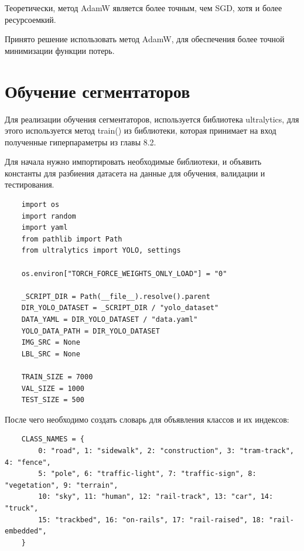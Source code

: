 \documentclass[areasetadvanced]{scrartcl}
\begin{document}
Теоретически, метод AdamW является более точным, чем SGD, хотя и более ресурсоемкий.

Принято решение использовать метод AdamW, для обеспечения более точной минимизации функции потерь.

\newpage
\section{Обучение сегментаторов}
Для реализации обучения сегментаторов, используется библиотека ultralytics, 
для этого используется метод train() из библиотеки, которая принимает на вход полученные 
гиперпараметры из главы 8.2.

Для начала нужно импортировать необходимые библиотеки, и объявить константы для разбиения датасета на
данные для обучения, валидации и тестирования.

\begin{lstlisting}
    import os
    import random
    import yaml
    from pathlib import Path
    from ultralytics import YOLO, settings
    
    os.environ["TORCH_FORCE_WEIGHTS_ONLY_LOAD"] = "0"
    
    _SCRIPT_DIR = Path(__file__).resolve().parent
    DIR_YOLO_DATASET = _SCRIPT_DIR / "yolo_dataset"
    DATA_YAML = DIR_YOLO_DATASET / "data.yaml"
    YOLO_DATA_PATH = DIR_YOLO_DATASET
    IMG_SRC = None
    LBL_SRC = None
    
    TRAIN_SIZE = 7000
    VAL_SIZE = 1000
    TEST_SIZE = 500
\end{lstlisting}

После чего необходимо создать словарь для объявления классов и их индексов:

\begin{lstlisting}
    CLASS_NAMES = {
        0: "road", 1: "sidewalk", 2: "construction", 3: "tram-track", 4: "fence",
        5: "pole", 6: "traffic-light", 7: "traffic-sign", 8: "vegetation", 9: "terrain",
        10: "sky", 11: "human", 12: "rail-track", 13: "car", 14: "truck",
        15: "trackbed", 16: "on-rails", 17: "rail-raised", 18: "rail-embedded",
    }
\end{lstlisting}
\end{document}
